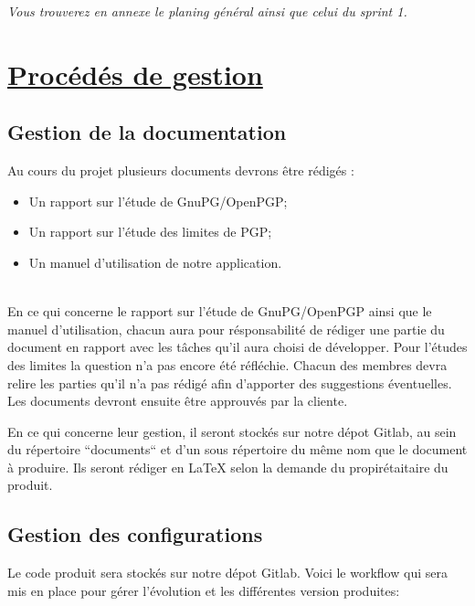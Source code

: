 \documentclass{../res/univ-projet}
\begin{document}
\textit{Vous trouverez en annexe le planing général ainsi que celui du sprint 1.} \\

\section{\underline{Procédés de gestion}}
\subsection{Gestion de la documentation}

Au cours du projet plusieurs documents devrons être rédigés :
\begin{itemize}
 \item Un rapport sur l'étude de GnuPG/OpenPGP;
 \item Un rapport sur l'étude des limites de PGP;
 \item Un manuel d'utilisation de notre application.
\end{itemize} ~\\

En ce qui concerne le rapport sur l'étude de GnuPG/OpenPGP ainsi que le manuel d'utilisation, chacun aura pour résponsabilité de rédiger une partie 
du document en rapport avec les tâches qu'il aura choisi de développer. Pour l'études des limites la question n'a pas encore été réfléchie. Chacun 
des membres devra relire les parties qu'il n'a pas rédigé afin d'apporter des suggestions éventuelles. Les documents devront ensuite être approuvés 
par la cliente.

En ce qui concerne leur gestion, il seront stockés sur notre dépot Gitlab, au sein du répertoire ``documents`` et d'un sous répertoire du même nom 
que le document à produire. Ils seront rédiger en LaTeX selon la demande du propirétaitaire du produit.
\newpage
\subsection{Gestion des configurations}

Le code produit sera stockés sur notre dépot Gitlab. Voici le workflow qui sera mis en place pour gérer l'évolution et les différentes version 
produites: \\
\end{document}

